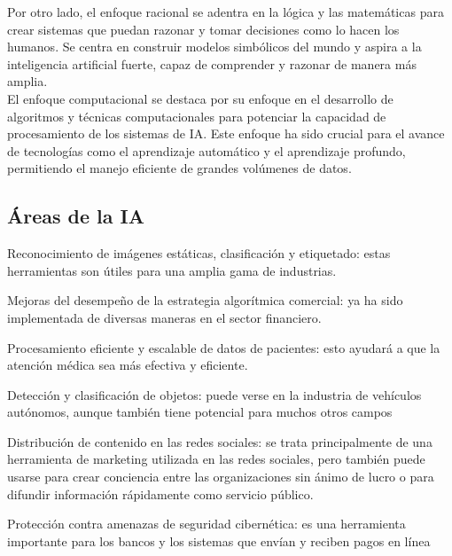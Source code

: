 Por otro lado, el enfoque racional se adentra en la lógica y las matemáticas para crear sistemas que 
puedan razonar y tomar decisiones como lo hacen los humanos. Se centra en construir modelos simbólicos del 
mundo y aspira a la inteligencia artificial fuerte, capaz de comprender y razonar de manera más amplia.\\


El enfoque computacional se destaca por su enfoque en el desarrollo de algoritmos y técnicas 
computacionales para potenciar la capacidad de procesamiento de los sistemas de IA. Este enfoque ha 
sido crucial para el avance de tecnologías como el aprendizaje automático y el aprendizaje profundo, 
permitiendo el manejo eficiente de grandes volúmenes de datos.\\


\subsection{Áreas de la IA}


\begin{myitemize}
    \item Reconocimiento de imágenes estáticas, clasificación y etiquetado: estas herramientas son útiles
    para una amplia gama de industrias.

    \item Mejoras del desempeño de la estrategia algorítmica comercial: ya ha sido implementada de diversas maneras en el sector financiero.
    
    \item Procesamiento eficiente y escalable de datos de pacientes: esto ayudará a que la atención médica sea más efectiva y eficiente. 
    
    \item Detección y clasificación de objetos: puede verse en la industria de vehículos autónomos, aunque también tiene potencial para muchos otros campos
    
    \item Distribución de contenido en las redes sociales: se trata principalmente de una herramienta de marketing utilizada en las redes sociales, pero también puede usarse para crear conciencia entre las organizaciones sin ánimo de lucro o para difundir información rápidamente como servicio público.
    
    \item Protección contra amenazas de seguridad cibernética: es una herramienta importante para los bancos y los sistemas que envían y reciben pagos en línea
\end{myitemize}



